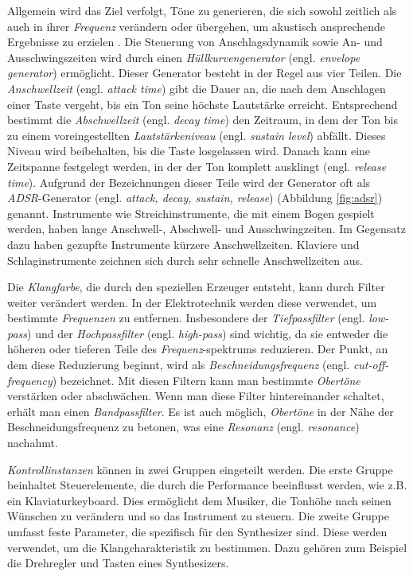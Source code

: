 \documentclass[
  a4paper,  %
  twoside,  %
  bibliography=totoc,
  headsepline,
  cleardoublepage=empty,
  parskip=half,
  draft=false
]{scrbook}
\begin{document}
{Allgemein wird das Ziel verfolgt, Töne zu generieren, die sich sowohl zeitlich als auch in ihrer \emph{Frequenz} verändern oder übergehen, um akustisch ansprechende Ergebnisse zu erzielen \cite{pirkle_designing_2021}. Die Steuerung von Anschlagsdynamik sowie An- und Ausschwingszeiten wird durch einen \emph{Hüllkurvengenerator} (engl. \emph{envelope generator}) ermöglicht. Dieser Generator besteht in der Regel aus vier Teilen. Die \emph{Anschwellzeit} (engl. \emph{attack time}) gibt die Dauer an, die nach dem Anschlagen einer Taste vergeht, bis ein Ton seine höchste Lautstärke erreicht. Entsprechend bestimmt die \emph{Abschwellzeit} (engl. \emph{decay time}) den Zeitraum, in dem der Ton bis zu einem voreingestellten \emph{Lautstärkeniveau} (engl. \emph{sustain level}) abfällt. Dieses Niveau wird beibehalten, bis die Taste losgelassen wird. Danach kann eine Zeitspanne festgelegt werden, in der der Ton komplett ausklingt (engl. \emph{release time}). Aufgrund der Bezeichnungen dieser Teile wird der Generator oft als \emph{ADSR}-Generator (engl. \emph{attack, decay, sustain, release}) (Abbildung \ref{fig:adsr}) genannt. Instrumente wie Streichinstrumente, die mit einem Bogen gespielt werden, haben lange Anschwell-, Abschwell- und Ausschwingzeiten. Im Gegensatz dazu haben gezupfte Instrumente kürzere Anschwellzeiten. Klaviere und Schlaginstrumente zeichnen sich durch sehr schnelle Anschwellzeiten aus. \cite{ruschkowski_elektronische_2019, russ_sound_2009}

Die \emph{Klangfarbe}, die durch den speziellen Erzeuger entsteht, kann durch Filter weiter verändert werden. In der Elektrotechnik werden diese verwendet, um bestimmte \emph{Frequenzen} zu entfernen. Insbesondere der \emph{Tiefpassfilter} (engl. \emph{low-pass}) und der \emph{Hochpassfilter} (engl. \emph{high-pass}) sind wichtig, da sie entweder die höheren oder tieferen Teile des \emph{Frequenz}-spektrums reduzieren. Der Punkt, an dem diese Reduzierung beginnt, wird als \emph{Beschneidungsfrequenz} (engl. \emph{cut-off-frequency}) bezeichnet. Mit diesen Filtern kann man bestimmte \emph{Obertöne} verstärken oder abschwächen. Wenn man diese Filter hintereinander schaltet, erhält man einen \emph{Bandpassfilter}. Es ist auch möglich, \emph{Obertöne} in der Nähe der Beschneidungsfrequenz zu betonen, was eine \emph{Resonanz} (engl. \emph{resonance}) nachahmt. \cite{ruschkowski_elektronische_2019}

\emph{Kontrollinstanzen} können in zwei Gruppen eingeteilt werden. Die erste Gruppe beinhaltet Steuerelemente, die durch die Performance beeinflusst werden, wie z.B. ein Klaviaturkeyboard. Dies ermöglicht dem Musiker, die Tonhöhe nach seinen Wünschen zu verändern und so das Instrument zu steuern. Die zweite Gruppe umfasst feste Parameter, die spezifisch für den Synthesizer sind. Diese werden verwendet, um die Klangcharakteristik zu bestimmen. Dazu gehören zum Beispiel die Drehregler und Tasten eines Synthesizers. \cite{russ_sound_2009}

}
\end{document}
